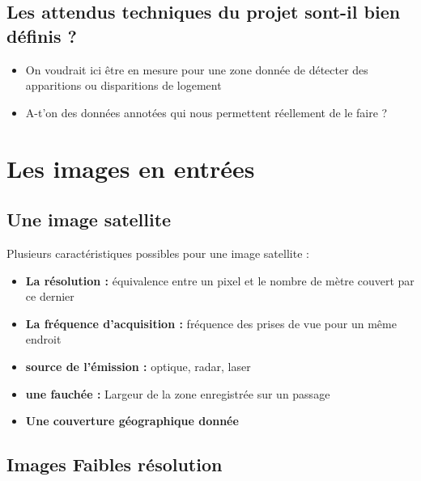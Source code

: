 \documentclass[
  letterpaper,
  DIV=11,
  numbers=noendperiod]{scrreprt}
\providecommand{\tightlist}{%
  \setlength{\itemsep}{0pt}\setlength{\parskip}{0pt}}\usepackage{longtable,booktabs,array}
\begin{document}
\hypertarget{les-attendus-techniques-du-projet-sont-il-bien-duxe9finis}{%
\section{Les attendus techniques du projet sont-il bien définis
?}\label{les-attendus-techniques-du-projet-sont-il-bien-duxe9finis}}

\begin{itemize}
\tightlist
\item
  On voudrait ici être en mesure pour une zone donnée de détecter des
  apparitions ou disparitions de logement
\item
  A-t'on des données annotées qui nous permettent réellement de le faire
  ?
\end{itemize}


\hypertarget{les-images-en-entruxe9es}{%
\chapter{Les images en entrées}\label{les-images-en-entruxe9es}}

\hypertarget{une-image-satellite}{%
\section{Une image satellite}\label{une-image-satellite}}

Plusieurs caractéristiques possibles pour une image satellite :

\begin{itemize}
\tightlist
\item
  \textbf{La résolution :} équivalence entre un pixel et le nombre de
  mètre couvert par ce dernier
\item
  \textbf{La fréquence d'acquisition :} fréquence des prises de vue pour
  un même endroit
\item
  \textbf{source de l'émission :} optique, radar, laser
\item
  \textbf{une fauchée :} Largeur de la zone enregistrée sur un passage
\item
  \textbf{Une couverture géographique donnée}
\end{itemize}

\hypertarget{images-faibles-ruxe9solution}{%
\section{Images Faibles résolution}\label{images-faibles-ruxe9solution}}
\end{document}
